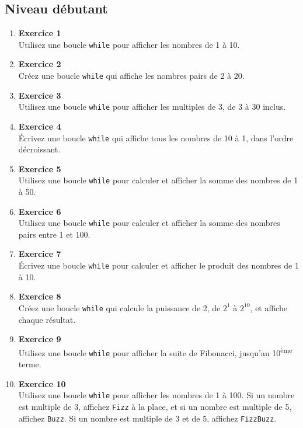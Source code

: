 \documentclass{article}
\begin{document}
\subsection{Niveau débutant}
\begin{enumerate}

    \item \textbf{Exercice 1} \\
    Utilisez une boucle \texttt{while} pour afficher les nombres de 1 à 10.

    \item \textbf{Exercice 2} \\
    Créez une boucle \texttt{while} qui affiche les nombres pairs de 2 à 20.

    \item \textbf{Exercice 3} \\
    Utilisez une boucle \texttt{while} pour afficher les multiples de 3, de 3 à 30 inclus.

    \item \textbf{Exercice 4} \\
    Écrivez une boucle \texttt{while} qui affiche tous les nombres de 10 à 1, dans l'ordre décroissant.

    \item \textbf{Exercice 5} \\
    Utilisez une boucle \texttt{while} pour calculer et afficher la somme des nombres de 1 à 50.

    \item \textbf{Exercice 6} \\
    Utilisez une boucle \texttt{while} pour calculer et afficher la somme des nombres pairs entre 1 et 100.

    \item \textbf{Exercice 7} \\
    Écrivez une boucle \texttt{while} pour calculer et afficher le produit des nombres de 1 à 10.

    \item \textbf{Exercice 8} \\
    Créez une boucle \texttt{while} qui calcule la puissance de 2, de \(2^1\) à \(2^{10}\), et affiche chaque résultat.

    \item \textbf{Exercice 9} \\
    Utilisez une boucle \texttt{while} pour afficher la suite de Fibonacci, jusqu'au 10\textsuperscript{ème} terme.

    \item \textbf{Exercice 10} \\
    Utilisez une boucle \texttt{while} pour afficher les nombres de 1 à 100. Si un nombre est multiple de 3, affichez \texttt{Fizz} à la place, et si un nombre est multiple de 5, affichez \texttt{Buzz}. Si un nombre est multiple de 3 et de 5, affichez \texttt{FizzBuzz}.

\end{enumerate}
\end{document}

